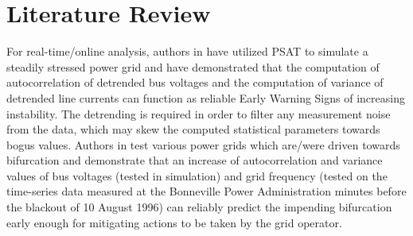 \section[Literature Review]{Literature Review}
\label{sec:litt}

For real-time/online analysis, authors in \cite{ghanvati01} have utilized PSAT to simulate a steadily stressed power grid and have demonstrated that the computation of autocorrelation of detrended bus voltages and the computation  of variance of detrended line currents can function as reliable Early Warning Signs of increasing instability. The detrending is required in order to filter any measurement noise from the data, which may skew the computed statistical parameters towards bogus values. Authors in \cite{sanchez01} test various power grids which are/were driven towards bifurcation and demonstrate that an increase of autocorrelation and variance values of bus voltages (tested in simulation) and grid frequency (tested on the time-series data measured at the Bonneville Power Administration minutes before the blackout of 10 August 1996) can reliably predict the impending bifurcation early enough for mitigating actions to be taken by the grid operator.